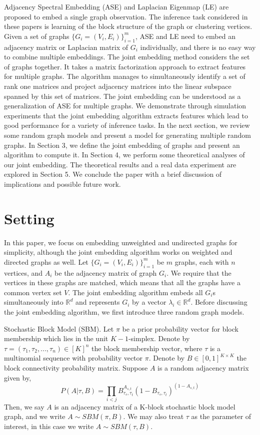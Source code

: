 \documentclass[10pt,journal,compsoc]{IEEEtran}
\newenvironment{definition}[1][Definition]{\begin{trivlist}
		\item[\hskip \labelsep {\bfseries #1}]}{\end{trivlist}}
\begin{document}
\noindent Adjacency Spectral Embedding (ASE) and Laplacian Eigenmap (LE) are proposed to embed a single graph observation\cite{sussman2012consistent, belkin2003laplacian}. The inference task considered in these papers is learning of the block structure of the graph or clustering vertices. Given a set of graphs $\{G_i=(V_i,E_i)\} _{i=1}^{m}$, ASE and LE need to embed an adjacency matrix or Laplacian matrix of $G_i$ individually, and there is no easy way to combine multiple embeddings. The joint embedding method considers the set of graphs together. It takes a matrix factorization approach to extract features for multiple graphs. The algorithm manages to simultaneously identify a set of rank one matrices and project adjacency matrices into the linear subspace spanned by this set of matrices. The joint embedding can be understood as a generalization of ASE for multiple graphs. We demonstrate through simulation experiments that the joint embedding algorithm extracts features which lead to good performance for a variety of inference tasks. In the next section, we review some random graph models and present a model for generating multiple random graphs. In Section 3, we define the joint embedding of graphs and present an algorithm to compute it. In Section 4, we perform some theoretical analyses of our joint embedding. The theoretical results and a real data experiment are explored in Section 5. We conclude the paper with a brief discussion of implications and possible future work.

\section{Setting}
In this paper, we focus on embedding unweighted and undirected graphs for simplicity, although the joint embedding algorithm works on weighted and directed graphs as well. Let $\{G_i=(V_i,E_i)\} _{i=1}^{m}$ be $m$ graphs, each with $n$ vertices, and $A_i$ be the adjacency matrix of graph $G_i$. We require that the vertices in these graphs are matched, which means that all the graphs have a common vertex set $V$. The joint embedding algorithm embeds all $G_i$s simultaneously into $\mathbb{R}^d$ and represents $G_i$  by a vector $\lambda_i \in \mathbb{R}^d$. Before discussing the joint embedding algorithm, we first introduce three random graph models.

\begin{definition} Stochastic Block Model (SBM). Let $\pi$ be a prior probability vector for block membership which lies in the unit $K-1$-simplex. Denote by $\tau=(\tau_1,\tau_2,...,\tau_n) \in [K]^n$ the block membership vector, where $\tau$ is a multinomial sequence with probability vector $\pi$.
Denote by $B \in [0,1]^{K \times K}$ the block connectivity probability matrix. Suppose $A$ is a random adjacency matrix given by,
\[ P(A|\tau,B)= \prod_{i<j} B_{\tau_s,\tau_t}^{A_{s,t}} (1-B_{\tau_s,\tau_t})^{(1-A_{s,t})}\] 
Then, we say $A$ is an adjacency matrix of a K-block stochastic block model graph, and we write $A \sim SBM(\pi,B)$. We may also treat $\tau$ as the parameter of interest, in this case we write $A \sim SBM(\tau,B)$.
\end{definition}
\end{document}
